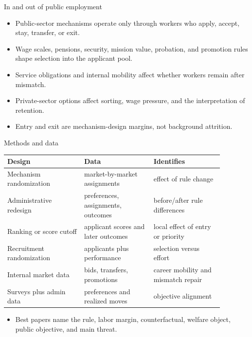 \documentclass[aspectratio=169,11pt]{beamer}
\begin{document}
\begin{frame}{In and out of public employment}
\begin{itemize}
    \item Public-sector mechanisms operate only through workers who apply, accept, stay, transfer, or exit.
    \item Wage scales, pensions, security, mission value, probation, and promotion rules shape selection into the applicant pool.
    \item Service obligations and internal mobility affect whether workers remain after mismatch.
    \item Private-sector options affect sorting, wage pressure, and the interpretation of retention.
    \item Entry and exit are mechanism-design margins, not background attrition.
\end{itemize}
\end{frame}

\begin{frame}{Methods and data}
\small
\begin{tabular}{p{0.31\linewidth} p{0.29\linewidth} p{0.28\linewidth}}
\toprule
Design & Data & Identifies \\
\midrule
Mechanism randomization & market-by-market assignments & effect of rule change \\
Administrative redesign & preferences, assignments, outcomes & before/after rule differences \\
Ranking or score cutoff & applicant scores and later outcomes & local effect of entry or priority \\
Recruitment randomization & applicants plus performance & selection versus effort \\
Internal market data & bids, transfers, promotions & career mobility and mismatch repair \\
Surveys plus admin data & preferences and realized moves & objective alignment \\
\bottomrule
\end{tabular}
\vspace{0.2cm}
\begin{itemize}
    \item Best papers name the rule, labor margin, counterfactual, welfare object, public objective, and main threat.
\end{itemize}
\end{frame}
\end{document}
